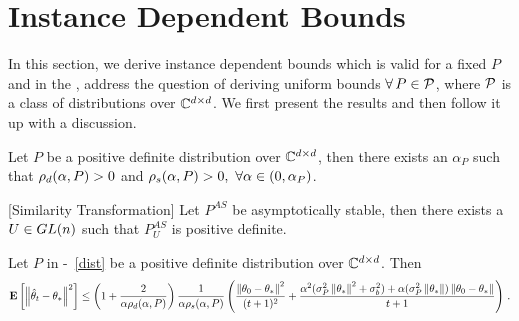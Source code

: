 \section{Instance Dependent Bounds}\label{sec:mainresults}
In this section, we derive instance dependent bounds  which is valid for a fixed $P$ and in the , address the question of deriving uniform bounds $\forall\,P\in \P$, where $\P$ is a class of distributions over $\C^{\dcd}$. We first present the results and then follow it up with a discussion.
\begin{lemma}\label{lm:pd}
Let $P$ be a positive definite distribution over $\C^{\dcd}$, then there exists an $\alpha_P$ such that $\rhod{P}>0$ and $\rhos{P}>0,~\forall \alpha \in (0,\alpha_P)$.
\end{lemma}
\begin{comment}
\begin{proof}
\begin{align*}
\rhos{P}&=\inf_{x:\norm{x}=1}x^* (A_P+A_P^*)x -\alpha x^*\EE{A_t^* A_t} x\\
&=\inf_{x:\norm{x}=1}x^* (A_P+A_P^*)x -\alpha x^* A^*_P A_P -\alpha x^* \EE{M_t^* M_t} x\\
&\geq \lambda_{\min}(A^*_P+A_P)-\alpha \norm{A_P}^2-\sigma^2_P
\end{align*}
The proof is complete by choosing $\alpha_P<\frac{\lambda_{\min}(A^*_P+A_P)}{\norm{A_P}^2+\sigma^2_P}$
\end{proof}
\end{comment}
\begin{lemma}\label{lm:simtran}[Similarity Transformation]
Let $P^{AS}$ be asymptotically stable, then there exists a $U\in \gln$ such that $P^{AS}_U$ is positive definite.
\end{lemma}

\begin{theorem}\label{th:pdrate}
Let $P$ in -~\ref{dist} be a positive definite distribution over $\C^{\dcd}$. Then
\begin{align*}
\EE{\norm{\thh_t-\ts}^2}
\leq
\left(1+\frac2{\alpha\rhod{P}}\right)\frac{1}{\alpha \rhos{P}}
\left(\frac{\norm{\theta_0-\ts}^2}{(t+1)^2}+ \frac{\alpha^2(\sigma_P^2\norm{\ts}^2+\sigma_b^2)+\alpha (\sigma_P^2\norm{\ts})\norm{\theta_0-\ts}}{t+1} \right)\,.
\end{align*}

\end{theorem}


